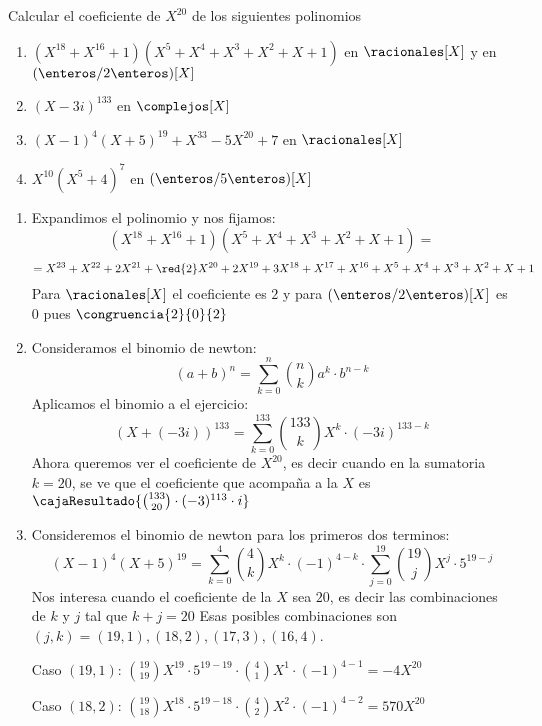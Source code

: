 \begin{enunciado}{\ejercicio}
Calcular el coeficiente de $X^{20}$ de los siguientes polinomios 
  \begin{enumerate}[label=\roman*)]
    \item $(X^{18} + X^{16} + 1)(X^5 + X^4 + X^3 + X^2 + X + 1)$ en $\racionales[X]$ y en $(\enteros/2\enteros)[X]$
    \item $(X - 3i)^{133}$ en $\complejos[X]$
    \item $(X - 1)^4(X + 5)^{19} + X^{33} - 5X^{20} + 7$ en $\racionales[X]$
    \item $X^{10}(X^5 + 4)^7$ en $(\enteros/5\enteros)[X]$
  \end{enumerate}
\end{enunciado}

\begin{enumerate}[label=\roman*)]
    \item Expandimos el polinomio y nos fijamos: 
    $$
    (X^{18} + X^{16} + 1)(X^5 + X^4 + X^3 + X^2 + X + 1) =
    $$ 
    $$
    = X^{23} + X^{22} + 2X^{21} + \red{2}X^{20} + 2X^{19} + 3X^{18} + X^{17} + X^{16} + X^5 + X^4 + X^3 + X^2 + X + 1
    $$
    Para $\racionales[X]$ el coeficiente es $2$ y para $(\enteros/2\enteros)[X]$ es $0$ pues $\congruencia{2}{0}{2}$

    \item Consideramos el binomio de newton: 
    $$
    (a + b)^n = \sum_{k=0}^{n} \binom{n}{k} a^k \cdot b^{n-k}
    $$
    Aplicamos el binomio a el ejercicio: 
    $$
    (X + (-3i))^{133} = \sum_{k=0}^{133} \binom{133}{k} X^k \cdot (-3i)^{133 - k}
    $$
    Ahora queremos ver el coeficiente de $X^20$, es decir cuando en la sumatoria $k = 20$, se ve que el coeficiente
    que acompaña a la $X$ es $\cajaResultado{\binom{133}{20} \cdot (-3)^{113} \cdot i}$

    \item Consideremos el binomio de newton para los primeros dos terminos: 
    $$
    (X - 1)^4(X + 5)^{19} = \sum_{k = 0}^{4} \binom{4}{k} X^k \cdot (-1)^{4 - k} \cdot \sum_{j=0}^{19} \binom{19}{j} X^j \cdot 5^{19 - j}
    $$
    Nos interesa cuando el coeficiente de la $X$ sea $20$, es decir las combinaciones de $k$ y $j$ tal que $k + j = 20$
    Esas posibles combinaciones son $(j,k) = (19,1),(18,2),(17,3),(16,4)$. 

    Caso $(19,1)$: $\binom{19}{19}X^{19} \cdot 5^{19-19} \cdot \binom{4}{1}X^1 \cdot (-1)^{4-1} = -4X^{20}$

    Caso $(18,2)$: $\binom{19}{18}X^{18} \cdot 5^{19-18} \cdot \binom{4}{2}X^2 \cdot (-1)^{4-2} = 570X^{20}$


\end{enumerate}
